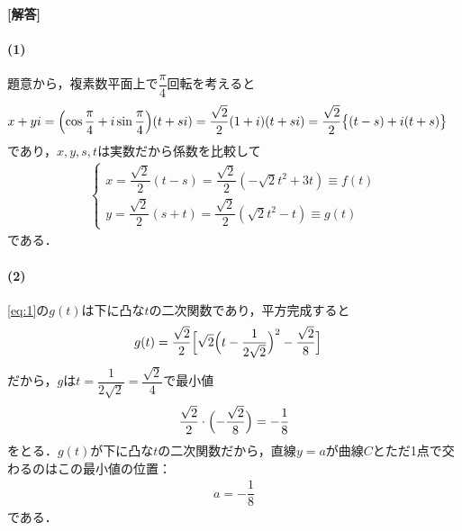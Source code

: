 \documentclass[../../main.tex]{subfiles}
\begin{document}
\begin{oframed}
  
\end{oframed}

{\bf [解答]}
\paragraph{(1)}

題意から，複素数平面上で$\dfrac{\pi}{4}$回転を考えると
\begin{align}
  x+yi&=\Bigl(\cos\dfrac{\pi}{4}+i\sin\dfrac{\pi}{4}\Bigr)(t+si)=\dfrac{\sqrt{2}}{2}(1+i)(t+si)=\dfrac{\sqrt{2}}{2}\bigl\{(t-s)+i(t+s)\bigr\}
\end{align}
であり，$x,y,s,t$は実数だから係数を比較して
\begin{align}
  \begin{cases}
    x=\dfrac{\sqrt{2}}{2}(t-s)=\dfrac{\sqrt{2}}{2}(-\sqrt{2}t^2+3t)\equiv f(t) \\
    y=\dfrac{\sqrt{2}}{2}(s+t)=\dfrac{\sqrt{2}}{2}(\sqrt{2}t^2-t)\equiv g(t)
  \end{cases} \label{eq:1}
\end{align}
である．

\paragraph{(2)}

\cref{eq:1}の$g(t)$は下に凸な$t$の二次関数であり，平方完成すると
\begin{align}
  g(t)
  &=\dfrac{\sqrt{2}}{2}\Bigl[\sqrt{2}\Bigl(t-\dfrac{1}{2\sqrt{2}}\Bigr)^2-\dfrac{\sqrt{2}}{8}\Bigr]
\end{align}
だから，$g$は$t=\dfrac{1}{2\sqrt{2}}=\dfrac{\sqrt{2}}{4}$で最小値
\begin{align}
  \dfrac{\sqrt{2}}{2}\cdot\Bigl(-\dfrac{\sqrt{2}}{8}\Bigr)=-\dfrac{1}{8}
\end{align}
をとる．$g(t)$が下に凸な$t$の二次関数だから，直線$y=a$が曲線$C$とただ1点で交わるのはこの最小値の位置：
\begin{align}
  a=-\dfrac{1}{8}
\end{align}
である．
\end{document}
